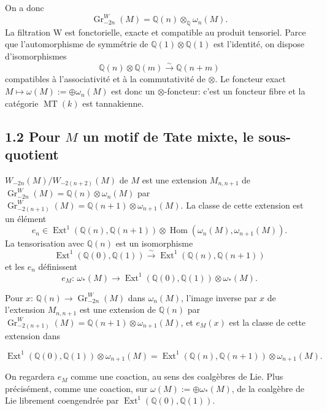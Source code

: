 \documentclass[11pt,a4paper]{article}
\theoremstyle{plain}
\theoremstyle{definition}
\theoremstyle{remark}
\DeclareMathOperator{\Ext}{Ext}
\DeclareMathOperator{\Hom}{Hom}
\DeclareMathOperator{\Gr}{Gr}
\DeclareMathOperator{\MT}{MT}
\newcommand{\dbQ}{\mathbb{Q}}
\newcommand{\simover}{\xrightarrow{\sim}}
\providecommand{\Hom}{\operatorname{Hom}}
\providecommand{\Ext}{\operatorname{Ext}}
\begin{document}
On a donc
\begin{equation}
\Gr_{-2n}^W(M)=\dbQ(n)\otimes_\dbQ
\omega_n(M).\end{equation}
La filtration W est fonctorielle, exacte et
compatible au produit tensoriel.
Parce que l'automorphisme de symm\'etrie de
$\dbQ(1)\otimes\dbQ(1)$ est l'identit\'e, on
dispose d'isomorphismes
\[
\dbQ(n)\otimes\dbQ(m)\simover\dbQ(n+m)
\]
compatibles \`a l'associativit\'e et \`a la
commutativit\'e de $\otimes$.
Le foncteur exact $M\mapsto
\omega(M):=\oplus\omega_n(M)$ est donc
un $\otimes$-foncteur: c'est un foncteur fibre
et la cat\'egorie $\MT(k)$ est tannakienne.
\subsection*{1.2 Pour $M$ un motif de Tate mixte, le sous-quotient}
$W_{-2n}(M)/W_{-2(n+2)}(M)$ de
$M$ est une extension $M_{n,n+1}$ de
$\Gr_{-2n}^W(M)=\dbQ(n)\otimes\omega_n(M)$ par
$\Gr_{-2(n+1)}^W(M)=\dbQ(n+1)\otimes\omega_{n+1}(M)$.
La classe de cette extension est un \'el\'ement
\begin{equation}
e_n\in \Ext^1(\dbQ(n),\dbQ(n+1))\otimes\Hom
(\omega_n(M),\omega_{n+1}(M)).
\end{equation}
La tensorisation avec $\dbQ(n)$ est un
isomorphisme
\begin{equation}
\Ext^1(\dbQ(0),\dbQ(1))\simover
\Ext^1(\dbQ(n),\dbQ(n+1))\tag{1.2.1}
\end{equation}
et les $e_n$ d\'efinissent
\begin{equation}
e_M\colon\,\omega_*(M)\to\Ext^1(\dbQ(0),
\dbQ(1))\otimes\omega_*(M).
\tag{1.2.2}
\end{equation}


Pour $x\colon\,\dbQ(n)\to\Gr_{-2n}^W(M)$ dans
$\omega_n(M)$, l'image inverse par $x$ de
l'extension $M_{n,n+1}$ est une extension de
$\dbQ(n)$ par $\Gr_{-2(n+1)}^W(M)=\dbQ(n+1)
\otimes\omega_{n+1}(M)$, et $e_M(x)$ est la
classe de cette extension dans

\[
\Ext^1(\dbQ(0),\dbQ(1))\otimes\omega_{n+1}(M)
=\Ext^1(\dbQ(n),\dbQ(n+1))\otimes\omega_{n+1}(M).
\]

On regardera $e_M$ comme une coaction, au sens
des coalg\`ebres de Lie.
Plus pr\'ecis\'ement, comme une coaction, sur
$\omega(M):=\oplus \omega_*(M)$, de la
coalg\`ebre de Lie librement coengendr\'ee par
$\Ext^1(\dbQ(0),\dbQ(1))$.
\end{document}
